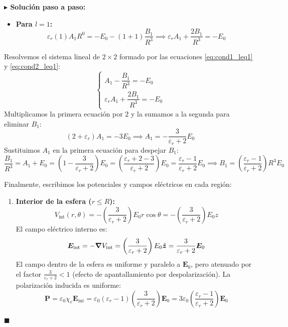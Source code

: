 \documentclass[11pt,a4paper]{book}
\newenvironment{solucion}{%
    \par\medskip\noindent\textbf{\color{blue!65!black}\Large $\blacktriangleright$ Solución paso a paso:}\par\medskip
}{%
    \hfill$\blacksquare$\par\bigskip
}
\newcommand{\zhat}{\hat{\bm{z}}}
\newcommand{\Evec}{\bm{E}}
\newcommand{\Pvec}{\bm{P}}
\begin{document}
\begin{solucion}
\begin{itemize}
    \item \textbf{Para $l = 1$:}
    \begin{equation}
        \varepsilon_r (1) A_1 R^{0} = -E_0 - (1+1)\frac{B_1}{R^3} \implies \varepsilon_r A_1 + \frac{2 B_1}{R^3} = -E_0 \label{eq:cond2_leq1}
    \end{equation}
\end{itemize}

Resolvemos el sistema lineal de $2 \times 2$ formado por las ecuaciones \eqref{eq:cond1_leq1} y \eqref{eq:cond2_leq1}:
\begin{equation}
    \begin{cases}
        A_1 - \dfrac{B_1}{R^3} = -E_0 \\[8pt]
        \varepsilon_r A_1 + \dfrac{2 B_1}{R^3} = -E_0
    \end{cases}
\end{equation}
Multiplicamos la primera ecuación por $2$ y la sumamos a la segunda para eliminar $B_1$:
\begin{equation}
    (2 + \varepsilon_r) A_1 = -3 E_0 \implies A_1 = -\frac{3}{\varepsilon_r + 2} E_0
\end{equation}
Sustituimos $A_1$ en la primera ecuación para despejar $B_1$:
\begin{equation}
    \frac{B_1}{R^3} = A_1 + E_0 = \left( 1 - \frac{3}{\varepsilon_r + 2} \right) E_0 = \left( \frac{\varepsilon_r + 2 - 3}{\varepsilon_r + 2} \right) E_0 = \frac{\varepsilon_r - 1}{\varepsilon_r + 2} E_0 \implies B_1 = \left(\frac{\varepsilon_r - 1}{\varepsilon_r + 2}\right) R^3 E_0
\end{equation}

Finalmente, escribimos los potenciales y campos eléctricos en cada región:
\begin{enumerate}
    \item \textbf{Interior de la esfera ($r \le R$):}
    \begin{equation}
        V_{\text{int}}(r,\theta) = -\left(\frac{3}{\varepsilon_r + 2}\right) E_0 r \cos\theta = -\left(\frac{3}{\varepsilon_r + 2}\right) E_0 z
    \end{equation}
    El campo eléctrico interno es:
    \begin{equation}
        \Evec_{\text{int}} = -\grad V_{\text{int}} = \left(\frac{3}{\varepsilon_r + 2}\right) E_0 \zhat = \frac{3}{\varepsilon_r + 2} \Evec_0
    \end{equation}
    El campo dentro de la esfera es uniforme y paralelo a $\Evec_0$, pero atenuado por el factor $\frac{3}{\varepsilon_r+2} < 1$ (efecto de apantallamiento por despolarización). La polarización inducida es uniforme:
    \begin{equation}
        \Pvec = \varepsilon_0 \chi_e \Evec_{\text{int}} = \varepsilon_0 (\varepsilon_r - 1)\left(\frac{3}{\varepsilon_r + 2}\right)\Evec_0 = 3\varepsilon_0 \left(\frac{\varepsilon_r - 1}{\varepsilon_r + 2}\right)\Evec_0
    \end{equation}


\end{enumerate}
\end{solucion}
\end{document}
